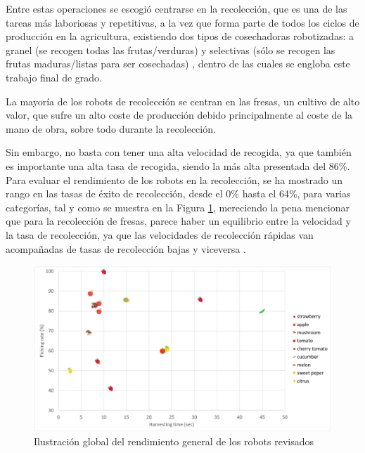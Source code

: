 Entre estas operaciones se escogió centrarse en la recolección, que es una de las tareas más laboriosas y repetitivas, a la vez que forma parte de todos los ciclos de producción en la agricultura, existiendo dos tipos de cosechadoras robotizadas: a granel (se recogen todas las frutas/verduras) y selectivas (sólo se recogen las frutas maduras/listas para ser cosechadas) \cite{Fountas20}, dentro de las cuales se engloba este trabajo final de grado. 

La mayoría de los robots de recolección se centran en las fresas, un cultivo de alto valor, que sufre un alto coste de producción debido principalmente al coste de la mano de obra, sobre todo durante la recolección. %

Sin embargo, no basta con tener una alta velocidad de recogida, ya que también es importante una alta tasa de recogida, siendo la más alta presentada del 86\%. 
Para evaluar el rendimiento de los robots en la recolección, se ha mostrado un rango en las tasas de éxito de recolección, desde el 0\% hasta el 64\%, para varias categorías, tal y como se muestra en la Figura \ref{fig:RendimientosCosecha}, mereciendo la pena mencionar que para la recolección de fresas, parece haber un equilibrio entre la velocidad y la tasa de recolección, ya que las velocidades de recolección rápidas van acompañadas de tasas de recolección bajas y viceversa \cite{Fountas20}. 

\begin{figure} [H]
    \begin{center}
      \includegraphics[width=16cm]{figs/Rendimiento cosecha robots.png}
    \end{center}
    \caption{Ilustración global del rendimiento general de los robots revisados}
    \label{fig:RendimientosCosecha}
\end{figure}

